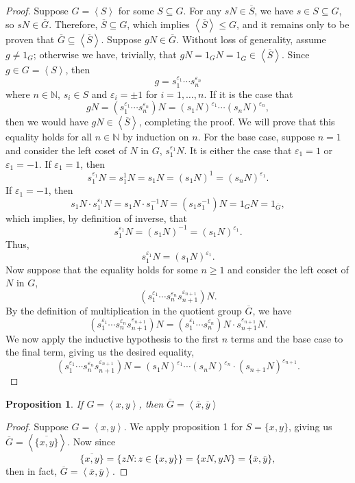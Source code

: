 \documentclass[12pt]{article}
\newtheorem{proposition}{Proposition}
\newcommand{\eqc}[1]{\overline{#1}}
\newcommand{\quo}[1]{\overline{#1}}
\newcommand{\<}{\left\langle}
\renewcommand{\>}{\right\rangle}
\newcommand{\N}{\mathbb{N}}
\let\eps\varepsilon
\begin{document}
\begin{proof}
    Suppose $G=\<S\>$ for some $S\subseteq G$. For any $sN\in \quo{S}$, we have $s \in S\subseteq G$, so $sN\in\quo{G}$. Therefore, $\quo{S}\subseteq G$, which implies $\<\quo{S}\>\leq G$, and it remains only to be proven that $\quo{G} \subseteq \<\quo{S}\>$. Suppose $gN \in \quo{G}$. Without loss of generality, assume $g\ne1_G$; otherwise we have, trivially, that $gN = 1_GN = 1_{\quo{G}} \in \<\quo{S}\>$. Since $g\in G = \<S\>$, then
    \[g = s_1^{\eps_1}\cdots s_n^{\eps_n}\]
    where $n\in\N$, $s_i\in S$ and $\eps_i = \pm1$ for $i=1,\dots,n$. If it is the case that
    \[gN = (s_1^{\eps_1}\cdots s_n^{\eps_n})N = (s_1N)^{\eps_1}\cdots(s_nN)^{\eps_n},\]
    then we would have $gN\in\<\quo{S}\>$, completing the proof. We will prove that this equality holds for all $n\in\N$ by induction on $n$. For the base case, suppose $n=1$ and consider the left coset of $N$ in $G$, $s_1^{\eps_1}N$. It is either the case that $\eps_1=1$ or $\eps_1=-1$. If $\eps_1 = 1$, then
    \[s_1^{\eps_1}N = s_1^1N = s_1N = (s_1N)^1 = (s_nN)^{\eps_1}.\]
    If $\eps_1 = -1$, then
    \[s_1N \cdot s_1^{\eps_1} N = s_1N \cdot s_1^{-1} N = (s_1s_1^{-1})N = 1_GN = 1_{\quo{G}},\]
    which implies, by definition of inverse, that
    \[s_1^{\eps_1}N = (s_1N)^{-1} = (s_1N)^{\eps_1}.\]
    Thus,
    \[s_1^{\eps_1}N = (s_1N)^{\eps_1}.\]
    Now suppose that the equality holds for some $n\geq1$ and consider the left coset of $N$ in $G$,
    \[(s_1^{\eps_1}\cdots s_n^{\eps_n} s_{n+1}^{\eps_{n+1}})N.\]
    By the definition of multiplication in the quotient group $\quo{G}$, we have
    \[(s_1^{\eps_1}\cdots s_n^{\eps_n} s_{n+1}^{\eps_{n+1}})N = (s_1^{\eps_1}\cdots s_n^{\eps_n})N \cdot s_{n+1}^{\eps_{n+1}}N.\]
    We now apply the inductive hypothesis to the first $n$ terms and the base case to the final term, giving us the desired equality,
    \[(s_1^{\eps_1}\cdots s_n^{\eps_n} s_{n+1}^{\eps_{n+1}})N = (s_1N)^{\eps_1}\cdots(s_nN)^{\eps_n} \cdot (s_{n+1}N)^{\eps_{n+1}}.\]
    
\end{proof}


\begin{proposition}
    If $G=\<x,y\>$, then $\quo{G}=\<\eqc{x}, \eqc{y}\>$
\end{proposition}

\begin{proof}
    Suppose $G=\<x,y\>$. We apply proposition 1 for $S=\{x,y\}$, giving us $\quo{G} = \<\quo{\{x,y\}}\>$. Now since
    \[\quo{\{x,y\}} = \{zN : z\in\{x,y\}\} = \{xN, yN\} = \{\eqc{x}, \eqc{y}\},\]
    then in fact, $\quo{G} = \<\eqc{x}, \eqc{y}\>$.
    
\end{proof}
\end{document}
